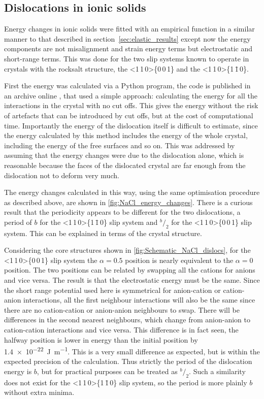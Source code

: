 \FloatBarrier
\subsection{Dislocations in ionic solids}
\FloatBarrier


Energy changes in ionic solids were fitted with an empirical function in a similar manner to that described in section~\ref{sec:elastic_results} except now the energy components are not misalignment and strain energy terms but electrostatic and short-range terms. This was done for the two slip systems known to operate in crystals with the rocksalt structure, the <1\,1\,0>\{0\,0\,1\} and the <1\,1\,0>\{1\,\={1}\,0\}.


First the energy was calculated via a Python program, the code is published in an archive online \cite{code}, that used a simple approach: calculating the energy for all the interactions in the crystal with no cut offs. This gives the energy without the risk of artefacts that can be introduced by cut offs, but at the cost of computational time. Importantly the energy of the dislocation itself is difficult to estimate, since the energy calculated by this method includes the energy of the whole crystal, including the energy of the free surfaces and so on. This was addressed by assuming that the energy changes were due to the dislocation alone, which is reasonable because the faces of the dislocated crystal are far enough from the dislocation not to deform very much.


The energy changes calculated in this way, using the same optimisation procedure as described above, are shown in \ref{fig:NaCl_energy_changes}. There is a curious result that the periodicity appears to be different for the two dislocations, a period of $b$ for the <1\,1\,0>\{1\,\={1}\,0\} slip system and $^b\!/_2$ for the <1\,1\,0>\{0\,0\,1\} slip system. This can be explained in terms of the crystal structure. 

Considering the core structures shown in \autoref{fig:Schematic_NaCl_dislocs}, for the <1\,1\,0>\{0\,0\,1\} slip system the $\alpha=0.5$ position is nearly equivalent to the $\alpha=0$ position. The two positions can be related by swapping all the cations for anions and vice versa. The result is that the electrostatic energy must be the same. Since the short range potential used here is symmetrical for anion-cation or cation-anion interactions, all the first neighbour interactions will also be the same since there are no cation-cation or anion-anion neighbours to swap. There will be differences in the second nearest neighbours, which change from anion-anion to cation-cation interactions and vice versa. This difference is in fact seen, the halfway position is lower in energy than the initial position by \SI{1.4e-22}{\joule\per\meter}. This is a very small difference as expected, but is within the expected precision of the calculation. Thus strictly the period of the dislocation energy is $b$, but for practical purposes can be treated as $^b\!/_2$. Such a similarity does not exist for the <1\,1\,0>\{1\,\={1}\,0\} slip system, so the period is more plainly $b$ without extra minima.





